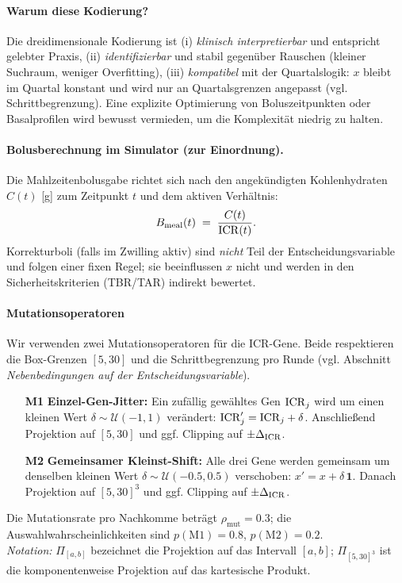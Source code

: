 \paragraph{Warum diese Kodierung?}
Die dreidimensionale Kodierung ist (i) \emph{klinisch interpretierbar} und entspricht gelebter Praxis, (ii) \emph{identifizierbar} und stabil gegen\"uber Rauschen (kleiner Suchraum, weniger Overfitting), (iii) \emph{kompatibel} mit der Quartalslogik: \(x\) bleibt im Quartal konstant und wird nur an Quartalsgrenzen angepasst (vgl. Schrittbegrenzung). Eine explizite Optimierung von Boluszeitpunkten oder Basalprofilen wird bewusst vermieden, um die Komplexit\"at niedrig zu halten.

\paragraph{Bolusberechnung im Simulator (zur Einordnung).}
Die Mahlzeitenbolusgabe richtet sich nach den angek\"undigten Kohlenhydraten \(C(t)\) [g] zum Zeitpunkt \(t\) und dem aktiven Verh\"altnis: \[B_{\mathrm{meal}}(t)\;=\;\frac{C(t)}{\mathrm{ICR}(t)}.\] Korrekturboli (falls im Zwilling aktiv) sind \emph{nicht} Teil der Entscheidungsvariable und folgen einer fixen Regel; sie beeinflussen \(x\) nicht und werden in den Sicherheitskriterien (TBR/TAR) indirekt bewertet.


\paragraph{Mutationsoperatoren}
Wir verwenden zwei Mutationsoperatoren für die ICR-Gene. Beide respektieren die Box-Grenzen \([5,30]\) und die Schrittbegrenzung pro Runde (vgl. Abschnitt \emph{Nebenbedingungen auf der Entscheidungsvariable}).
\begin{itemize}
  \item[\textbf{M1}] \textbf{Einzel-Gen-Jitter:} Ein zufällig gewähltes Gen \(\mathrm{ICR}_j\) wird um einen kleinen Wert \(\delta\sim\mathcal{U}(-1,1)\) verändert: \(\mathrm{ICR}'_j=\mathrm{ICR}_j+\delta\). Anschließend Projektion auf \([5,30]\) und ggf. Clipping auf \(\pm\Delta_{\mathrm{ICR}}\).
  \item[\textbf{M2}] \textbf{Gemeinsamer Kleinst-Shift:} Alle drei Gene werden gemeinsam um denselben kleinen Wert \(\delta\sim\mathcal{U}(-0.5,0.5)\) verschoben: \(x' = x + \delta\,\mathbf{1}\). Danach Projektion auf \([5,30]^3\) und ggf. Clipping auf \(\pm\Delta_{\mathrm{ICR}}\).
\end{itemize}
Die Mutationsrate pro Nachkomme beträgt \(\rho_{\mathrm{mut}}=0.3\); die Auswahlwahrscheinlichkeiten sind \(p(\text{M1})=0.8\), \(p(\text{M2})=0.2\).\\
\emph{Notation:} \(\Pi_{[a,b]}\) bezeichnet die Projektion auf das Intervall \([a,b]\); \(\Pi_{[5,30]^3}\) ist die komponentenweise Projektion auf das kartesische Produkt.


